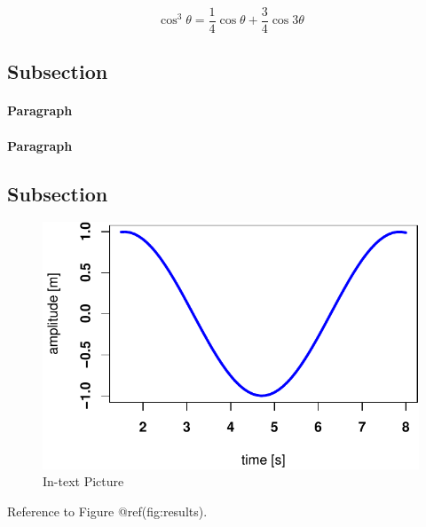 \documentclass[fleqn,10pt,lineno]{wlpeerj} %
\begin{document}
\lipsum[4] 

\begin{equation}
\cos^3 \theta =\frac{1}{4}\cos\theta+\frac{3}{4}\cos 3\theta
\label{eq:refname2}
\end{equation}

\lipsum[5] 

\subsection*{Subsection}\label{subsection}

\lipsum[6] 

\paragraph{Paragraph}

\lipsum[7]  \paragraph{Paragraph} \lipsum[8] 

\subsection*{Subsection}\label{subsection-1}

\lipsum[9] 

\begin{figure}
\includegraphics[width=1\linewidth]{manuscript_files/figure-latex/results-1} \caption{In-text Picture}\label{fig:results}
\end{figure}

Reference to Figure @ref(fig:results).
\end{document}
